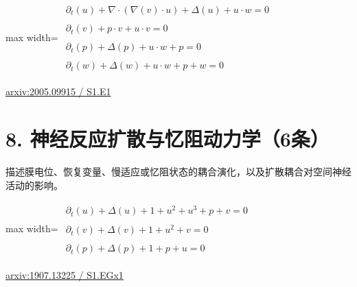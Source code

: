 \documentclass[UTF8,10pt,a4paper,fontset=mac]{ctexart}
\begin{document}
\begin{minipage}{\linewidth}\begin{center}\begin{adjustbox}{max width=\linewidth}$\displaystyle\begin{gathered}\begin{gathered}\partial_{t}(u)+\nabla\cdot(\nabla(v)\cdot u)+\Delta(u)+u\cdot w=0\end{gathered}\\[5pt]\begin{gathered}\partial_{t}(v)+p\cdot v+u\cdot v=0\end{gathered}\\[5pt]\begin{gathered}\partial_{t}(p)+\Delta(p)+u\cdot w+p=0\end{gathered}\\[5pt]\begin{gathered}\partial_{t}(w)+\Delta(w)+u\cdot w+p+w=0\end{gathered}\end{gathered}$\end{adjustbox}\end{center}{\small\href{https://arxiv.org/html/2005.09915#S1.E1}{arxiv:2005.09915 / S1.E1}}\par\end{minipage}\par\vspace{6mm}

\section*{8. 神经反应扩散与忆阻动力学（6条）}
描述膜电位、恢复变量、慢适应或忆阻状态的耦合演化，以及扩散耦合对空间神经活动的影响。\par\medskip

\begin{minipage}{\linewidth}\begin{center}\begin{adjustbox}{max width=\linewidth}$\displaystyle\begin{gathered}\begin{gathered}\partial_{t}(u)+\Delta(u)+1+u^{2}+u^{3}+p+v=0\end{gathered}\\[5pt]\begin{gathered}\partial_{t}(v)+\Delta(v)+1+u^{2}+v=0\end{gathered}\\[5pt]\begin{gathered}\partial_{t}(p)+\Delta(p)+1+p+u=0\end{gathered}\end{gathered}$\end{adjustbox}\end{center}{\small\href{https://arxiv.org/html/1907.13225#S1.EGx1}{arxiv:1907.13225 / S1.EGx1}}\par\end{minipage}\par\vspace{6mm}
\end{document}
